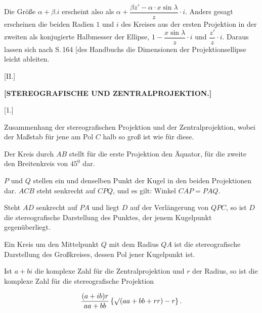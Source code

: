 
Die Größe $\alpha+\beta.i$ erscheint also als $\alpha+\dfrac{\beta z' - \alpha\cdot x\sin\lambda}{z}\cdot i$. Anders gesagt erscheinen die beiden Radien $1$ und $i$ des Kreises aus der ersten Projektion in der zweiten als konjugierte Halbmesser der Ellipse, $1-\dfrac{x\sin\lambda}{z}\cdot i$ und $\dfrac{z'}{z}\cdot i$. Daraus lassen sich nach S.\,164 [des Handbuchs die Dimensionen der Projektionsellipse leicht ableiten.



\begin{center}
[II.]
\end{center}

\begin{center}
\bfseries [STEREOGRAFISCHE UND ZENTRALPROJEKTION.]
\end{center}

\begin{center}
[1.]
\end{center}

\begin{center}
Zusammenhang der stereografischen Projektion und der Zentralprojektion, wobei\\
der Maßstab für jene am Pol $C$ halb so groß ist wie für diese.
\end{center}

Der Kreis durch $AB$ stellt für die erste Projektion den Äquator, für die zweite den Breitenkreis von $45^0$ dar.

\begin{center}\end{center}
\indent $P$ und $Q$ stellen ein und denselben Punkt der Kugel in den beiden Projektionen dar. $ACB$ steht senkrecht auf $CPQ$, und es gilt: Winkel $CAP = PAQ$.

Steht $AD$ senkrecht auf $PA$ und liegt $D$ auf der Verlängerung von $QPC$, so ist $D$ die stereografische Darstellung des Punktes, der jenem Kugelpunkt gegenüberliegt.

Ein Kreis um den Mittelpunkt $Q$ mit dem Radius $QA$ ist die stereografische Darstellung des Großkreises, dessen Pol jener Kugelpunkt ist.

Ist $a+bi$ die komplexe Zahl für die Zentralprojektion und $r$ der Radius, so ist die komplexe Zahl für die stereografische Projektion

\[
\frac{(a+ib)r}{aa+bb}\left\{\mathord{\surd}(aa+bb+rr)-r\right\}.
\]


